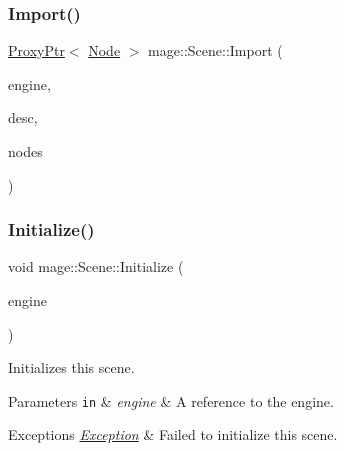 \mbox{\label{classmage_1_1_scene_ac3ac7fd6eb1e6f59626b65f3da8553a4}} 
\subsubsection{\texorpdfstring{Import()}{Import()}\hspace{0.1cm}{\footnotesize\ttfamily [2/2]}}
{\footnotesize\ttfamily \mbox{\hyperlink{classmage_1_1_proxy_ptr}{Proxy\+Ptr}}$<$ \mbox{\hyperlink{classmage_1_1_node}{Node}} $>$ mage\+::\+Scene\+::\+Import (\begin{DoxyParamCaption}\item[{\mbox{\hyperlink{classmage_1_1_engine}{Engine}} \&}]{engine,  }\item[{const \mbox{\hyperlink{classmage_1_1rendering_1_1_model_descriptor}{rendering\+::\+Model\+Descriptor}} \&}]{desc,  }\item[{std\+::vector$<$ \mbox{\hyperlink{classmage_1_1_proxy_ptr}{Proxy\+Ptr}}$<$ \mbox{\hyperlink{classmage_1_1_node}{Node}} $>$ $>$ \&}]{nodes }\end{DoxyParamCaption})}

\mbox{\label{classmage_1_1_scene_a0edb77d5e45bd1822793d189a45fbb5c}} 
\subsubsection{\texorpdfstring{Initialize()}{Initialize()}}
{\footnotesize\ttfamily void mage\+::\+Scene\+::\+Initialize (\begin{DoxyParamCaption}\item[{\mbox{\hyperlink{classmage_1_1_engine}{Engine}} \&}]{engine }\end{DoxyParamCaption})}

Initializes this scene.


\begin{DoxyParams}[1]{Parameters}
\mbox{\tt in}  & {\em engine} & A reference to the engine. \\
\hline
\end{DoxyParams}

\begin{DoxyExceptions}{Exceptions}
{\em \mbox{\hyperlink{classmage_1_1_exception}{Exception}}} & Failed to initialize this scene. \\
\hline
\end{DoxyExceptions}
\mbox{\label{classmage_1_1_scene_a02ec2f7b43fd7050bc41eb7d89d4baba}} 

